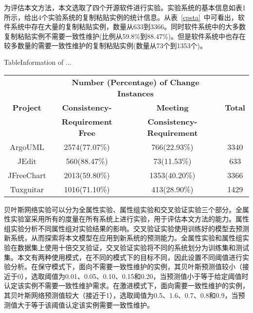 为评估本文方法，本文选取了四个开源软件进行实验。实验系统的基本信息如表1所示，给出4个实验系统的复制粘贴实例的统计信息。从表~\ref{cpsta}~中可看出，软件系统中存在大量的复制粘贴实例，数量从633到3366。同时软件系统中的大多数复制粘贴实例不需要一致性维护(比例从59.8\%到88.47\%)。但是软件系统中也存在较多数量的需要一致性维护的复制粘贴实例(数量从73个到1353个)。

\begin{table}[htbp]
{Table$\!$}{Information of ...}
\vspace{0.5em}
\centering
\wuhao
\begin{tabular}{cccc}
\toprule[1.5pt]
\multirow{3}{*}{\textbf{Project}}& \multicolumn{2}{c}{\textbf{Number (Percentage) of Change Instances}} & \multirow{3}{*}{\textbf{Total}}\\
\cline{2-3}
&\textbf{Consistency-} &\textbf{Meeting} &  \\
&\textbf{Requirement Free}&\textbf{Consistency-Requirement}& \\
\midrule[1pt]
ArgoUML&	2574(77.07\%)&	766(22.93\%)&	3340\\
JEdit&	560(88.47\%)&	73(11.53\%)&	633\\
JFreeChart&	2013(59.80\%)&	1353(40.20\%)&	3366\\
Tuxguitar&	1016(71.10\%)&	413(28.90\%)&	1429\\
\bottomrule[1.5pt]
\end{tabular}
\end{table}


贝叶斯网络实验可以分为全属性实验、属性组实验和交叉验证实验三个部分。全属性实验室采用所有的度量在所有系统上进行实验，用于评估本文方法的能力。属性组实验分析不同属性组对实验结果的影响。交叉验证实验使用训练好的模型去预测新系统，从而探索将本文模型在应用到新系统的预测能力。全属性实验和属性组实验在数据集上使用十倍交叉验证，交叉验证实验将不同的系统划分为训练集和测试集。本文有两种使用模式，在不同的模式下的目标不同，因此设置不同阈值进行实验分析。在保守模式下，面向不需要一致性维护的实例，其贝叶斯预测值较小（接近于0），选取阈值为0.01、0.05、0.10、0.15和0.20，当预测值小于等于给定阈值时认定该实例不需要一致性维护需求。在激进模式下，面向需要一致性维护的实例，其贝叶斯网络预测值较大（接近于1），选取阈值为0.5、1.6、0.7、0.8和0.9，当预测值大于等于该阈值认定该实例需要一致性维护。

